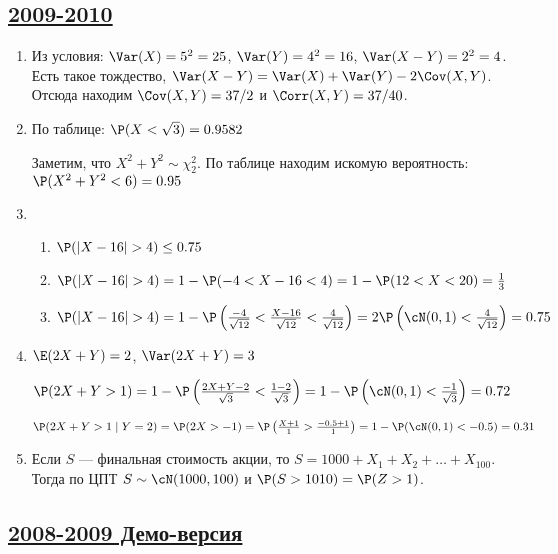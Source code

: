 \subsection[2009-2010]{\hyperref[sec:kr_01_2009_2010]{2009-2010}}
\label{sec:sol_kr_01_2009_2010}

\begin{enumerate}
\item Из условия: $\Var(X) = 5^2 = 25$, $\Var(Y) = 4^2 = 16$, $\Var(X - Y) = 2^2 = 4$.
Есть такое тождество, $\Var(X - Y) = \Var(X) + \Var(Y) - 2\Cov(X,Y)$. Отсюда находим
$\Cov(X, Y) = 37/2$ и $\Corr(X, Y) = 37/40$.
\item По таблице: $\P(X<\sqrt{3}) = 0.9582$

Заметим, что $X^2 + Y^2 \sim \chi^2_2$. По таблице находим искомую вероятность:
$\P(X^2 + Y^2<6) = 0.95$
\item
\begin{enumerate}
\item $\P(|X - 16| > 4) \leq 0.75$
\item $\P(|X - 16| > 4) = 1 - \P(-4 < X-16 < 4) = 1 - \P(12 < X < 20) = \frac{1}{3}$
\item $\P(|X - 16| > 4) =  1 - \P\left(\frac{-4}{\sqrt{12}} < \frac{X-16}{\sqrt{12}}
< \frac{4}{\sqrt{12}}\right) = 2 \P\left(\cN(0, 1)<\frac{4}{\sqrt{12}}\right) = 0.75$
\end{enumerate}
\item $\E(2X + Y) = 2$, $\Var(2X + Y) = 3$

$\P(2X+Y>1) = 1 - \P\left(\frac{2X+Y - 2}{\sqrt{3}} < \frac{1-2}{\sqrt{3}}\right) =
1 - \P\left(\cN(0,1) < \frac{-1}{\sqrt{3}}\right)= 0.72$

$\P(2X+Y>1 \mid Y=2) = \P(2X>-1) = \P\left(\frac{X+1}{1} > \frac{-0.5+1}{1} \right) =
1 - \P(\cN(0,1)< -0.5) = 0.31$
\item Если $S$ — финальная стоимость акции, то $S = 1000 + X_1 + X_2 + \ldots + X_{100}$.
Тогда по ЦПТ $S\sim \cN(1000,100)$ и $\P(S > 1010) = \P(Z > 1)$.
\end{enumerate}



\subsection[2008-2009 Демо-версия]{\hyperref[sec:kr_01_2008_2009_demo]{2008-2009 Демо-версия}}
\label{sec:sol_kr_01_2008_2009_demo}

